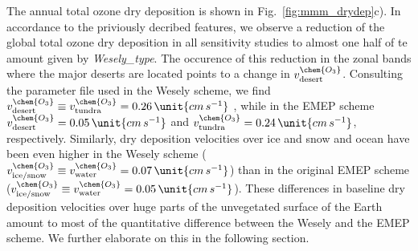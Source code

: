 \documentclass[gmd, manuscript]{copernicus}
\begin{document}
The annual total ozone dry deposition is shown in Fig.~\ref{fig:mmm_drydep}c). In accordance to the priviously decribed features, we observe a reduction of the global total ozone dry deposition in all sensitivity studies to almost one half of te amount given by \emph{Wesely\_type}. The occurence of this reduction in the zonal bands where the major deserts are located points to a change in $v_\text{desert}^\chem{O_3}$. Consulting the parameter file used in the Wesely scheme, we find $v_\text{desert}^\chem{O_3} \equiv v_\text{tundra}^\chem{O_3} = 0.26\,\unit{cm\,s^{-1}}$ \citep{JGR:Hough1991}, while in the EMEP scheme $v_\text{desert}^\chem{O_3}=0.05\,\unit{cm\,s^{-1}}$ and $v^\chem{O_3}_\text{tundra} = 0.24\,\unit{cm\,s^{-1}}$, respectively. Similarly, dry deposition velocities over ice and snow and ocean have been even higher in the Wesely scheme ($v_\text{ice/snow}^\chem{O_3}\equiv v_\text{water}^\chem{O_3}=0.07\,\unit{cm\,s^{-1}}$) than in the original EMEP scheme ($v_\text{ice/snow}^\chem{O_3}\equiv v_\text{water}^\chem{O_3}=0.05\,\unit{cm\,s^{-1}}$). These differences in baseline dry deposition velocities over huge parts of the unvegetated surface of the Earth amount to most of the quantitative difference between the Wesely and the EMEP scheme. We further elaborate on this in the following section.
\end{document}
